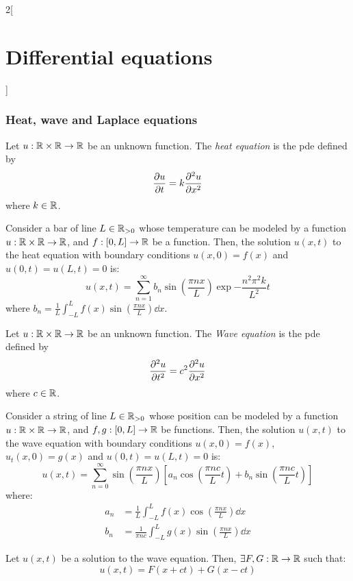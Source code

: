 \documentclass[../../../main.tex]{subfiles}
\begin{document}
\begin{multicols}{2}[\section{Differential equations}]
  \subsubsection{Heat, wave and Laplace equations}
  \begin{definition}
    Let $u:\mathbb{R}\times\mathbb{R}\rightarrow\mathbb{R}$ be an unknown function. The \emph{heat equation} is the pde defined by $$\pdv{u}{t}=k\pdv[2]{u}{x}$$ where $k\in\mathbb{R}$.
  \end{definition}
  \begin{proposition}
    Consider a bar of line $L\in\mathbb{R}_{>0}$ whose temperature can be modeled by a function $u:\mathbb{R}\times\mathbb{R}\rightarrow\mathbb{R}$, and $f:[0,L]\rightarrow\mathbb{R}$ be a function. Then, the solution $u(x,t)$ to the heat equation with boundary conditions $u(x,0)=f(x)$ and $u(0,t)=u(L,t)=0$ is: $$u(x,t)=\sum_{n=1}^\infty b_n\sin\left(\frac{\pi n x}{L}\right)\exp{-\frac{n^2\pi^2k}{L^2}t}$$ where $\displaystyle b_n=\frac{1}{L}\int_{-L}^Lf(x)\sin\left(\frac{\pi n x}{L}\right)\dd{x}$.
  \end{proposition}
  \begin{definition}
    Let $u:\mathbb{R}\times\mathbb{R}\rightarrow\mathbb{R}$ be an unknown function. The \emph{Wave equation} is the pde defined by $$\pdv[2]{u}{t}=c^2\pdv[2]{u}{x}$$ where $c\in\mathbb{R}$.
  \end{definition}
  \begin{proposition}
    Consider a string of line $L\in\mathbb{R}_{>0}$ whose position can be modeled by a function $u:\mathbb{R}\times\mathbb{R}\rightarrow\mathbb{R}$, and $f,g:[0,L]\rightarrow\mathbb{R}$ be functions. Then, the solution $u(x,t)$ to the wave equation with boundary conditions $u(x,0)=f(x)$, $u_t(x,0)=g(x)$ and $u(0,t)=u(L,t)=0$ is: $$u(x,t)=\sum_{n=0}^\infty \sin\left(\frac{\pi n x}{L}\right)\left[a_n\cos\left(\frac{\pi n c}{L}t\right)+ b_n\sin\left( \frac{\pi n c}{L}t\right)\right]$$ where:
    \begin{align*}
      a_n & =\frac{1}{L}\int_{-L}^Lf(x)\cos\left(\frac{\pi n x}{L}\right)\dd{x}       \\
      b_n & =\frac{1}{\pi n c}\int_{-L}^Lg(x)\sin\left(\frac{\pi n x}{L}\right)\dd{x}
    \end{align*}
  \end{proposition}
  \begin{proposition}
    Let $u(x,t)$ be a solution to the wave equation. Then, $\exists F,G:\mathbb{R}\rightarrow\mathbb{R}$ such that: $$u(x,t)=F(x+ct)+G(x-ct)$$
  \end{proposition}
  \begin{proposition}

\end{proposition}
\end{multicols}
\end{document}
